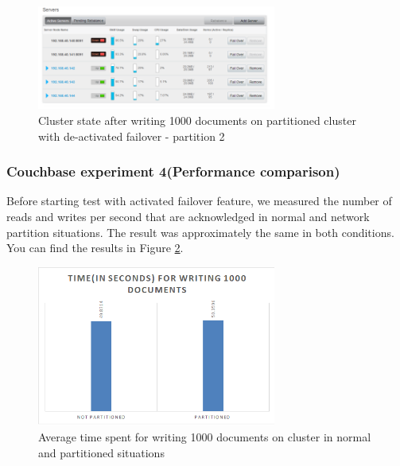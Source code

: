 \documentclass[a4paper]{article}
\begin{document}
\begin{figure}[h!]
	\centering
	\includegraphics[width=0.7\textwidth]{diagram4}
	\caption{Cluster state after writing 1000 documents on partitioned cluster with de-activated failover - partition 2}
	\label{fig:diagram4}
\end{figure}

\subsubsection{Couchbase experiment 4(Performance comparison)} 
Before starting test with activated failover feature, we measured the number of reads and writes per second that are acknowledged in normal and network partition situations.
The result was approximately the same in both conditions.
You can find the results in Figure \ref{fig:diagram5}.
\begin{figure}[h!]
	\centering
	\includegraphics[width=0.7\textwidth]{diagram5}
	\caption{Average time spent for writing 1000 documents on cluster in normal and partitioned situations}
	\label{fig:diagram5}
\end{figure}
\end{document}

